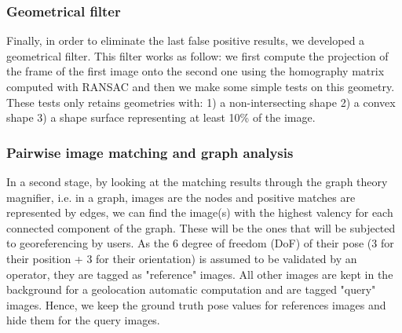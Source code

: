 \documentclass[fleqn,10pt]{wlpeerj} %
\begin{document}
\subsubsection*{Geometrical filter}
Finally, in order to eliminate the last false positive results, we developed 
a geometrical filter.
This filter works as follow: we first compute the projection of the frame of the first
image onto the second one using the  homography matrix computed with RANSAC and then
we make some simple tests on this geometry. These tests only retains geometries with:
1) a non-intersecting shape
2) a convex shape
3) a shape surface representing at least 10\% of the image.

\subsubsection*{Pairwise image matching and graph analysis}
In a second stage,
by looking at the matching results through the graph theory magnifier, i.e. 
in a graph, images are the nodes and positive matches are represented by edges, 
we can find the image(s) with the highest valency for each connected component 
of the graph.
These will be the ones that will be subjected to georeferencing by users. 
As the 6 degree of freedom (DoF) of their pose (3 for their position + 3 for 
their orientation) is assumed to be validated by an operator, they are tagged as 
"reference" images. 
All other images are kept in the background for a geolocation automatic computation
and are tagged "query" images.
Hence, we keep the ground truth pose values for references images and hide them 
for the query images.
\end{document}
